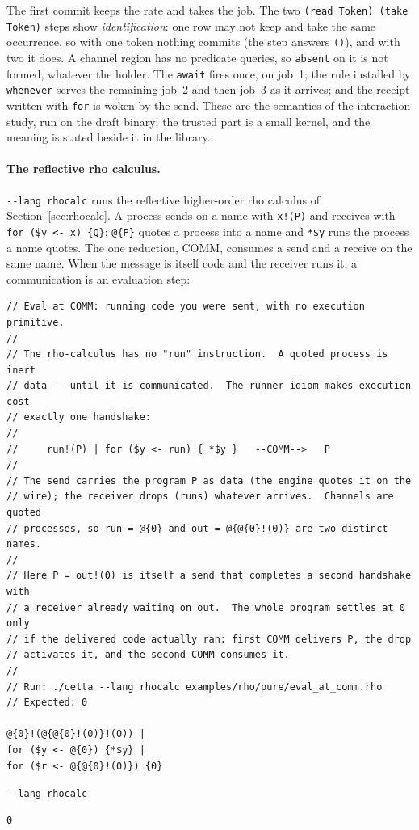 \documentclass[11pt]{article}
\newcommand{\code}[1]{\texttt{#1}}
\newcommand{\outhead}[1]{{\footnotesize\sffamily #1}\par\vspace{1pt}}
\begin{document}
\noindent
The first commit keeps the rate and takes the job.  The two
\code{(read Token) (take Token)} steps show \emph{identification}: one row may
not keep and take the same occurrence, so with one token nothing commits (the
step answers \code{()}), and with two it does.  A channel region has no predicate
queries, so \code{absent} on it is not formed, whatever the holder.  The
\code{await} fires once, on job~1; the rule installed by \code{whenever}
serves the remaining job~2 and then job~3 as it arrives; and the receipt
written with \code{for} is woken by the send.  These are the semantics of the
interaction study, run on the draft binary; the trusted part is a small
kernel, and the meaning is stated beside it in the library.

\paragraph{The reflective rho calculus.}
\code{-{}-lang rhocalc} runs the reflective higher-order rho calculus of
Section~\ref{sec:rhocalc}.  A process sends on a name with \code{x!(P)} and
receives with \code{for (\$y <- x) \{Q\}}; \code{@\{P\}} quotes a process into
a name and \code{*\$y} runs the process a name quotes.  The one reduction,
COMM, consumes a send and a receive on the same name.  When the message is
itself code and the receiver runs it, a communication is an evaluation step:

\begin{lstlisting}[style=metta,caption={Evaluation at COMM in the strict-core rho calculus},label={lst:t10}]
// Eval at COMM: running code you were sent, with no execution primitive.
//
// The rho-calculus has no "run" instruction.  A quoted process is inert
// data -- until it is communicated.  The runner idiom makes execution cost
// exactly one handshake:
//
//     run!(P) | for ($y <- run) { *$y }   --COMM-->   P
//
// The send carries the program P as data (the engine quotes it on the
// wire); the receiver drops (runs) whatever arrives.  Channels are quoted
// processes, so run = @{0} and out = @{@{0}!(0)} are two distinct names.
//
// Here P = out!(0) is itself a send that completes a second handshake with
// a receiver already waiting on out.  The whole program settles at 0 only
// if the delivered code actually ran: first COMM delivers P, the drop
// activates it, and the second COMM consumes it.
//
// Run: ./cetta --lang rhocalc examples/rho/pure/eval_at_comm.rho
// Expected: 0

@{0}!(@{@{0}!(0)}!(0)) |
for ($y <- @{0}) {*$y} |
for ($r <- @{@{0}!(0)}) {0}
\end{lstlisting}
\noindent\begin{minipage}[t]{0.98\textwidth}
\outhead{\code{-{}-lang rhocalc}}
\begin{lstlisting}[style=out]
0
\end{lstlisting}
\end{minipage}
\end{document}
